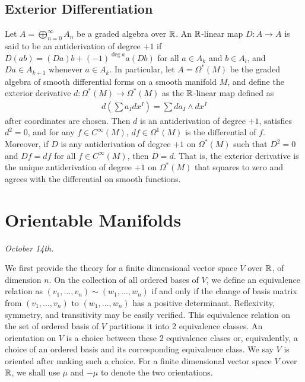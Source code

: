 \subsection{Exterior Differentiation}

Let $A = \bigoplus_{n=0}^{\infty} A_{n}$ be a graded algebra over $\mathbb{R}$. An $\mathbb{R}$-linear map $D:A \to A$ is said to be an antiderivation of degree $+1$ if $D(ab) = (Da)b + (-1)^{\deg a}a(Db)$ for all $a \in A_{k}$ and $b \in A_{l}$, and $Da \in A_{k+1}$ whenever $a \in A_{k}$. In particular, let $A = \Omega^{\ast}(M)$ be the graded algebra of smooth differential forms on a smooth manifold $M$, and define the exterior derivative $d:\Omega^{\ast}(M) \to \Omega^{\ast}(M)$ as the $\mathbb{R}$-linear map defined as
\begin{align}
    d\left(\sum a_{I} dx^{I}\right) = \sum da_{I} \wedge dx^{I}
\end{align}
after coordinates are chosen. Then $d$ is an antiderivation of degree $+1$, satisfies $d^{2} = 0$, and for any $f \in C^{\infty}(M)$, $df \in \Omega^{1}(M)$ is the differential of $f$. Moreover, if $D$ is any antiderivation of degree $+1$ on $\Omega^{\ast}(M)$ such that $D^{2} = 0$ and $Df = df$ for all $f \in C^{\infty}(M)$, then $D = d$. That is, the exterior derivative is the unique antiderivation of degree $+1$ on $\Omega^{\ast}(M)$ that squares to zero and agrees with the differential on smooth functions.

\section{Orientable Manifolds}
\textit{October 14th.}

We first provide the theory for a finite dimensional vector space $V$ over $\mathbb{R}$, of dimension $n$. On the collection of all ordered bases of $V$, we define an equivalence relation as $(v_{1},\ldots,v_{n}) \sim (w_{1},\ldots,w_{n})$ if and only if the change of basis matrix from $(v_{1},\ldots,v_{n})$ to $(w_{1},\ldots,w_{n})$ has a positive determinant. Reflexivity, symmetry, and transitivity may be easily verified. This equivalence relation on the set of ordered basis of $V$ partitions it into 2 equivalence classes. An orientation on $V$ is a choice between these 2 equivalence clases or, equivalently, a choice of an ordered basis and its corresponding equivalence class. We say $V$ is oriented after making such a choice. For a finite dimensional vector space $V$ over $\mathbb{R}$, we shall use $\mu$ and $-\mu$ to denote the two orientations.

